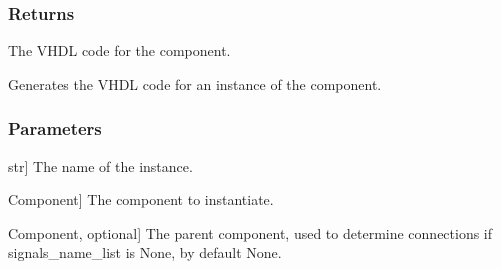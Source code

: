 \documentclass[letterpaper,10pt,english]{sphinxmanual}
\begin{document}
\begin{fulllineitems}
\begin{fulllineitems}
\subsubsection{Returns}
\label{\detokenize{component:returns}}\begin{description}
\sphinxAtStartPar
The VHDL code for the component.

\end{description}

\end{fulllineitems}


\begin{fulllineitems}
\label{\detokenize{component:component.Component.component_instance}}
\pysigstartsignatures
{}
\pysigstopsignatures
\sphinxAtStartPar
Generates the VHDL code for an instance of the component.


\subsubsection{Parameters}
\label{\detokenize{component:parameters}}\begin{description}
\sphinxlineitem{instance\_name}{[}str{]}
\sphinxAtStartPar
The name of the instance.

\sphinxlineitem{component}{[}Component{]}
\sphinxAtStartPar
The component to instantiate.

\sphinxlineitem{component\_parent}{[}Component, optional{]}
\sphinxAtStartPar
The parent component, used to determine connections if signals\_name\_list is None, by default None.


\end{description}
\end{fulllineitems}
\end{fulllineitems}
\end{document}
